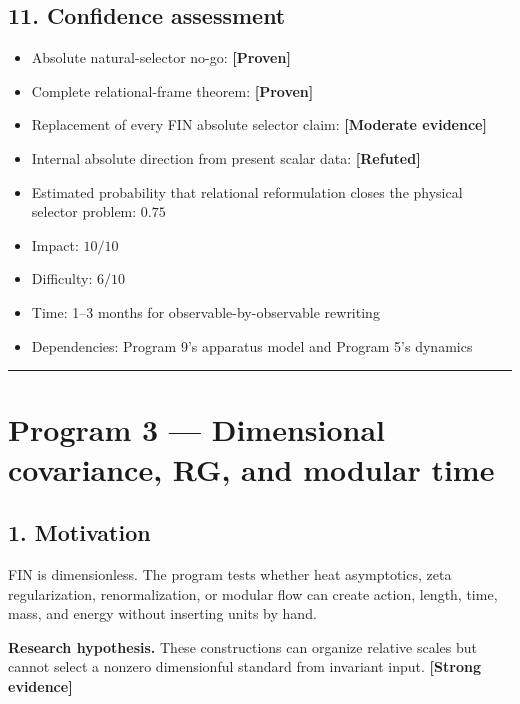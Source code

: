 \documentclass[11pt,a4paper,openany]{report}
\newcommand{\statusProven}{\textcolor{fingreen}{[Proven]}}
\newcommand{\statusStrong}{\textcolor{finblue}{[Strong evidence]}}
\newcommand{\statusModerate}{\textcolor{finviolet}{[Moderate evidence]}}
\newcommand{\statusRefuted}{\textcolor{finred}{[Refuted]}}
\begin{document}
\section{11. Confidence assessment}

\begin{itemize}
\item 
Absolute natural-selector no-go: \textbf{\statusProven{}}

\item 
Complete relational-frame theorem: \textbf{\statusProven{}}

\item 
Replacement of every FIN absolute selector claim: \textbf{\statusModerate{}}

\item 
Internal absolute direction from present scalar data: \textbf{\statusRefuted{}}

\item 
Estimated probability that relational reformulation closes the physical selector problem: \(0.75\)

\item 
Impact: \(10/10\)

\item 
Difficulty: \(6/10\)

\item 
Time: 1–3 months for observable-by-observable rewriting

\item 
Dependencies: Program 9's apparatus model and Program 5's dynamics

\end{itemize}

\par\medskip\hrule\medskip

\chapter{Program 3 — Dimensional covariance, RG, and modular time}

\section{1. Motivation}

FIN is dimensionless. The program tests whether heat asymptotics, zeta regularization, renormalization, or modular flow can create action, length, time, mass, and energy without inserting units by hand.

\textbf{Research hypothesis.} These constructions can organize relative scales but cannot select a nonzero dimensionful standard from invariant input. \textbf{\statusStrong{}}
\end{document}
